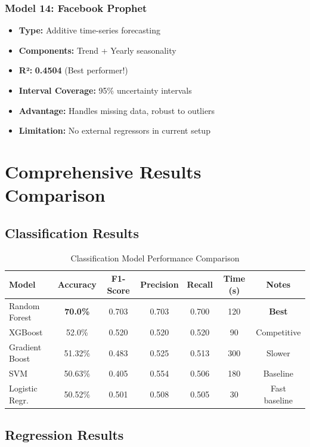 \subsubsection{Model 14: Facebook Prophet}
\begin{itemize}
    \item \textbf{Type:} Additive time-series forecasting
    \item \textbf{Components:} Trend + Yearly seasonality
    \item \textbf{R²:} \textbf{0.4504} (Best performer!)
    \item \textbf{Interval Coverage:} 95\% uncertainty intervals
    \item \textbf{Advantage:} Handles missing data, robust to outliers
    \item \textbf{Limitation:} No external regressors in current setup
\end{itemize}

\section{Comprehensive Results Comparison}

\subsection{Classification Results}

\begin{table}[H]
\centering
\caption{Classification Model Performance Comparison}
\begin{tabularx}{\textwidth}{lcccccc}
\toprule
\textbf{Model} & \textbf{Accuracy} & \textbf{F1-Score} & \textbf{Precision} & \textbf{Recall} & \textbf{Time (s)} & \textbf{Notes} \\
\midrule
Random Forest & \textbf{70.0\%} & 0.703 & 0.703 & 0.700 & 120 & \textbf{Best} \\
XGBoost & 52.0\% & 0.520 & 0.520 & 0.520 & 90 & Competitive \\
Gradient Boost & 51.32\% & 0.483 & 0.525 & 0.513 & 300 & Slower \\
SVM & 50.63\% & 0.405 & 0.554 & 0.506 & 180 & Baseline \\
Logistic Regr. & 50.52\% & 0.501 & 0.508 & 0.505 & 30 & Fast baseline \\
\bottomrule
\end{tabularx}
\end{table}

\subsection{Regression Results}

